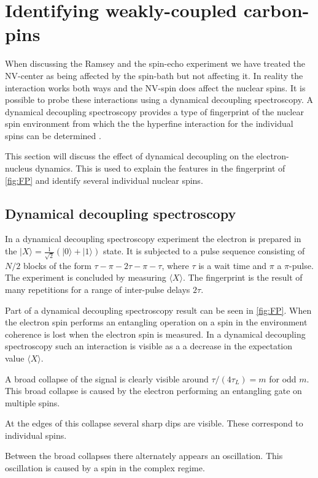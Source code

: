 \section{Identifying weakly-coupled carbon-pins}
When discussing the Ramsey and the spin-echo experiment we have treated the NV-center as being affected by the spin-bath but not affecting it.
In reality the interaction works both ways and the NV-spin does affect the nuclear spins.
It is possible to probe these interactions using a dynamical decoupling spectroscopy.
A dynamical decoupling spectroscopy provides a type of fingerprint of the nuclear spin environment from which the the hyperfine interaction for the individual spins can be determined \citep{Taminiau2012Detection,Taminiau2014Universal}.

This section will discuss the effect of dynamical decoupling on the electron-nucleus dynamics.
This is used to explain the features in the fingerprint of \cref{fig:FP} and identify several individual nuclear spins.


\subsection{Dynamical decoupling spectroscopy}

In a dynamical decoupling spectroscopy experiment the electron is prepared in the $|X\rangle =\tfrac{1}{\sqrt{2}}\left( |0\rangle +|1\rangle \right) $ state.
It is subjected to a pulse sequence consisting of $N/2$ blocks of the form {$\tau - \pi -2\tau-\pi-\tau$}, where $\tau$ is a wait time and $\pi$ a $\pi$-pulse.
The experiment is concluded by measuring $\langle X\rangle $.
The fingerprint is the result of many repetitions for a range of inter-pulse delays $2\tau$.

Part of a dynamical decoupling spectroscopy result can be seen in \cref{fig:FP}.
When the electron spin performs an entangling operation on a spin in the environment coherence is lost when the electron spin is measured.
In a dynamical decoupling spectroscopy such an interaction is visible as a a decrease in the expectation value $\langle X\rangle$.

A broad collapse of the signal is clearly visible around $\tau/(4\tau_L) = m$ for odd $m$.
This broad collapse is caused by the electron performing an entangling gate on multiple spins.

At the edges of this collapse several sharp dips are visible.
These correspond to individual spins.

Between the broad collapses there alternately appears an oscillation.
This oscillation is caused by a spin in the complex regime.

